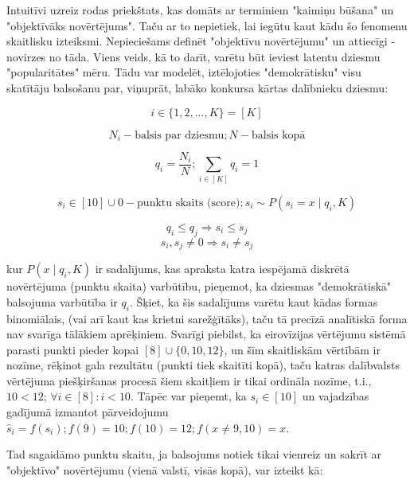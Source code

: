 \documentclass[12pt, a4paper]{article}
\begin{document}
Intuitīvi uzreiz rodas priekštats, kas domāts ar terminiem "kaimiņu būšana" un "objektīvāks novērtējums". Taču ar to nepietiek, lai iegūtu kaut kādu šo fenomenu skaitlisku izteiksmi. Nepieciešams definēt "objektīvu novērtējumu" un attiecīgi - novirzes no tāda. Viens veids, kā to darīt, varētu būt ieviest latentu dziesmu "popularitātes" mēru. Tādu var modelēt, iztēlojoties "demokrātisku" visu skatītāju balsošanu par, viņuprāt, labāko konkursa kārtas dalībnieku dziesmu:

\begin{equation}
 i \in \lbrace 1,2,...,K \rbrace = [K]
\end{equation}

\begin{equation}
    N_i - \text{balsis par dziesmu}; N - \text{balsis kopā}
\end{equation}

\begin{equation}
    q_i = \frac{N_i}{N}; \sum_{i\in[K]} q_i = 1
\end{equation}

\begin{equation}
    s_i \in [10] \cup 0 - \text{punktu skaits (score)}; s_i \sim P(s_i = x \mid q_i, K)
\end{equation}

\begin{equation}
    q_i \leq q_j \Rightarrow s_i \leq s_j
\end{equation}
\begin{equation}
    s_i, s_j \neq 0 \Rightarrow s_i \neq s_j
\end{equation}


kur $P(x \mid q_i, K)$ ir sadalījums, kas apraksta katra iespējamā diskrētā novērtējuma (punktu skaita) varbūtību, pieņemot, ka dziesmas "demokrātiskā" balsojuma varbūtība ir $q_i$. Šķiet, ka šis sadalījums varētu kaut kādas formas binomiālais, (vai arī kaut kas krietni sarežģītāks), taču tā precīzā analītiskā forma nav svarīga tālākiem aprēķiniem. Svarīgi piebilst, ka eirovīzijas vērtējumu sistēmā parasti punkti pieder kopai $[8] \cup \lbrace 0, 10, 12 \rbrace$, un šīm skaitliskām vērtībām ir nozīme, rēķinot gala rezultātu (punkti tiek skaitīti kopā), taču katras dalībvalsts vērtējuma piešķiršanas procesā šiem skaitļiem ir tikai ordināla nozīme, t.i., $10<12$; $\forall i \in [8]: i < 10$. Tāpēc var pieņemt, ka $s_i \in [10]$ un vajadzības gadījumā izmantot pārveidojumu $\hat s_i = f(s_i); f(9)=10;f(10)=12;f(x \neq 9,10)=x$.

Tad sagaidāmo punktu skaitu, ja balsojums notiek tikai vienreiz un sakrīt ar "objektīvo" novērtējumu (vienā valstī, visās kopā), var izteikt kā:
\end{document}
